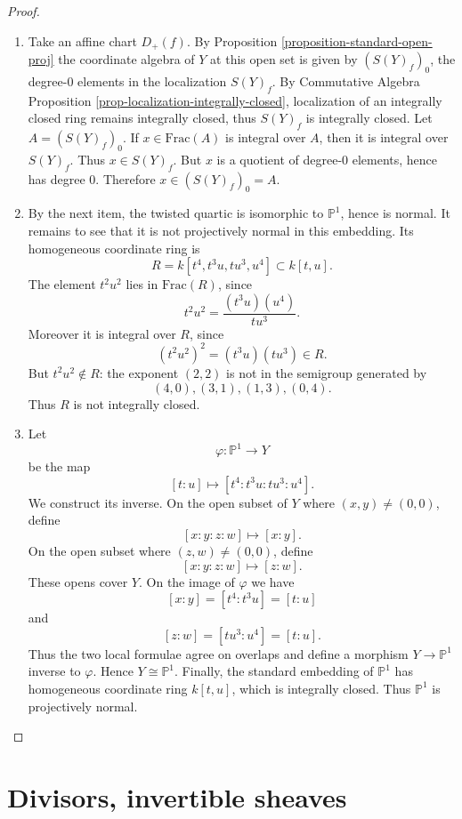 \begin{proof}
\begin{enumerate}
\item Take an affine chart $D_+(f)$.
By Proposition
\ref{proposition-standard-open-proj}
the coordinate algebra of $Y$
at this open set is given by
$(S(Y)_f)_0$, the degree-0 elements
in the localization $S(Y)_f$.
By Commutative Algebra Proposition
\ref{prop-localization-integrally-closed},
localization of an integrally closed
ring remains integrally closed,
thus $S(Y)_f$ is integrally closed.
Let $A=(S(Y)_f)_0$.
If $x \in \text{Frac}(A)$ is integral
over $A$, then it is integral over
$S(Y)_f$.
Thus $x \in S(Y)_f$.
But $x$ is a quotient of degree-0
elements, hence has degree 0.
Therefore $x \in (S(Y)_f)_0=A$.

\item By the next item, the twisted quartic
is isomorphic to $\mathbb{P}^1$, hence is
normal.
It remains to see that it is not
projectively normal in this embedding.
Its homogeneous coordinate ring is
\[
R=k[t^4,t^3u,tu^3,u^4]\subset k[t,u].
\]
The element $t^2u^2$ lies in
$\text{Frac}(R)$, since
\[
t^2u^2=\frac{(t^3u)(u^4)}{tu^3}.
\]
Moreover it is integral over $R$, since
\[
(t^2u^2)^2=(t^3u)(tu^3)\in R.
\]
But $t^2u^2\notin R$: the exponent
$(2,2)$ is not in the semigroup generated
by
\[
(4,0),(3,1),(1,3),(0,4).
\]
Thus $R$ is not integrally closed.

\item Let
\[
\varphi:\mathbb{P}^1\to Y
\]
be the map
\[
[t:u]\longmapsto [t^4:t^3u:tu^3:u^4].
\]
We construct its inverse.
On the open subset of $Y$ where
$(x,y)\neq (0,0)$, define
\[
[x:y:z:w]\longmapsto [x:y].
\]
On the open subset where
$(z,w)\neq (0,0)$, define
\[
[x:y:z:w]\longmapsto [z:w].
\]
These opens cover $Y$.
On the image of $\varphi$ we have
\[
[x:y]=[t^4:t^3u]=[t:u]
\]
and
\[
[z:w]=[tu^3:u^4]=[t:u].
\]
Thus the two local formulae agree on
overlaps and define a morphism
$Y\to \mathbb{P}^1$ inverse to
$\varphi$.
Hence $Y\cong \mathbb{P}^1$.
Finally, the standard embedding of
$\mathbb{P}^1$ has homogeneous
coordinate ring $k[t,u]$,
which is integrally closed.
Thus $\mathbb{P}^1$ is projectively
normal.
\end{enumerate}
\end{proof}



\section{Divisors, invertible sheaves}
\label{section-divisors-line-bundles}

